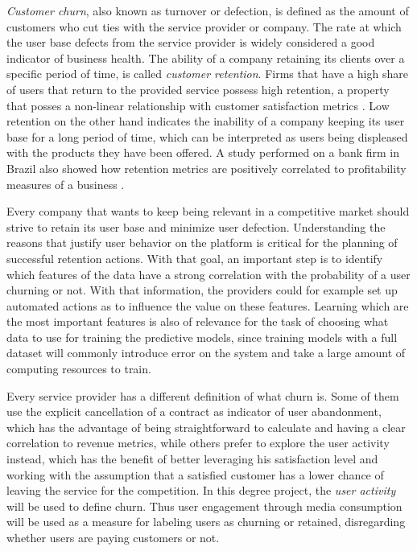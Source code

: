 \documentclass{kththesis}
\begin{document}
\emph{Customer churn}, also known as turnover or defection, is defined as the amount of customers who cut ties with the service provider or company. The rate at which the user base defects from the service provider is widely considered a good indicator of business health. The ability of a company retaining its clients over a specific period of time, is called \emph{customer retention}. Firms that have a high share of users that return to the provided service possess high retention, a property that posses a non-linear relationship with customer satisfaction metrics \citep{hennig1997impact}. Low retention on the other hand indicates the inability of a company keeping its user base for a long period of time, which can be interpreted as users being displeased with the products they have been offered. A study performed on a bank firm in Brazil also showed how retention metrics are positively correlated to profitability measures of a business \citep{morgan2006value}. 
        
Every company that wants to keep being relevant in a competitive market should strive to retain its user base and minimize user defection. Understanding the reasons that justify user behavior on the platform is critical for the planning of successful retention actions. With that goal, an important step is to identify which features of the data have a strong correlation with the probability of a user churning or not. With that information, the providers could for example set up automated actions as to influence the value on these features. Learning which are the most important features is also of relevance for the task of choosing what data to use for training the predictive models, since training models with a full dataset will commonly introduce error on the system and take a large amount of computing resources to train.

Every service provider has a different definition of what churn is. Some of them use the explicit cancellation of a contract as indicator of user abandonment, which has the advantage of being straightforward to calculate and having a clear correlation to revenue metrics, while others prefer to explore the user activity instead, which has the benefit of better leveraging his satisfaction level and working with the assumption that a satisfied customer has a lower chance of leaving the service for the competition. In this degree project, the \emph{user activity} will be used to define churn. Thus user engagement through media consumption will be used as a measure for labeling users as churning or retained, disregarding whether users are paying customers or not.
\end{document}

